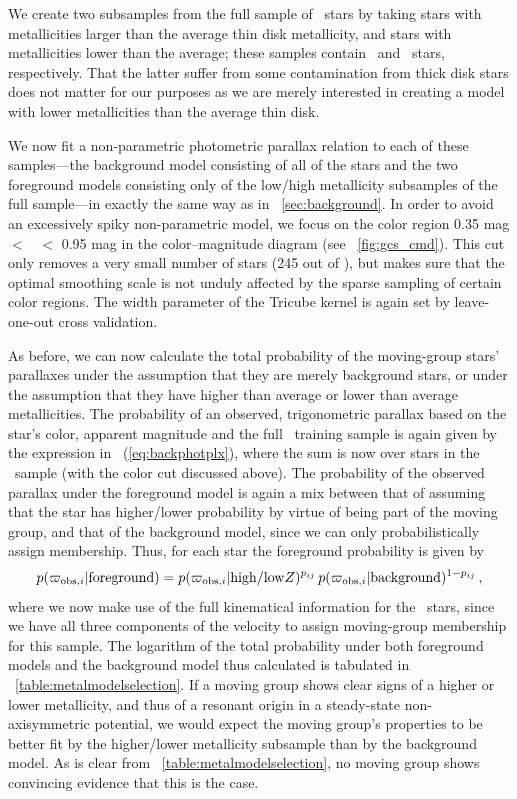 We create two subsamples from the full sample of \ngcsstars\ stars by
taking stars with metallicities larger than the average thin disk
metallicity, and stars with metallicities lower than the average;
these samples contain \nphotgcscolorcuthighz\ and
\nphotgcscolorcutlowz\ stars, respectively. That the latter suffer
from some contamination from thick disk stars does not matter for our
purposes as we are merely interested in creating a model with lower
metallicities than the average thin disk.

We now fit a non-parametric photometric parallax relation to each of
these samples---the background model consisting of all of the stars
and the two foreground models consisting only of the low/high
metallicity subsamples of the full sample---in exactly the same way as
in \sectionname~\ref{sec:background}. In order to avoid an excessively
spiky non-parametric model, we focus on the color region 0.35 mag $<$
\bminusv\ $<$ 0.95 mag in the color--magnitude diagram (see
\figurename~\ref{fig:gcs_cmd}). This cut only removes a very small
number of stars (245 out of \ngcsstars), but makes sure that the
optimal smoothing scale is not unduly affected by the sparse sampling
of certain color regions. The width parameter of the Tricube kernel is
again set by leave-one-out cross validation.

As before, we can now calculate the total probability of the
moving-group stars' parallaxes under the assumption that they are
merely background stars, or under the assumption that they have higher
than average or lower than average metallicities. The probability of
an observed, trigonometric parallax based on the star's color,
apparent magnitude and the full \gcsabb\ training sample is again
given by the expression in \eqnname~(\ref{eq:backphotplx}), where the
sum is now over stars in the \gcsabb\ sample (with the color cut
discussed above). The probability of the observed parallax under the
foreground model is again a mix between that of assuming that the star
has higher/lower probability by virtue of being part of the moving
group, and that of the background model, since we can only
probabilistically assign membership. Thus, for each star the
foreground probability is given by
\begin{equation}
p(\varpi_{\mathrm{obs},i} | \mathrm{foreground}) = p(\varpi_{\mathrm{obs},i} | \mathrm{high/low} Z)^{p_{ij}}\,p(\varpi_{\mathrm{obs},i} | \mathrm{background})^{1-p_{ij}}\,,
\end{equation}
where we now make use of the full kinematical information for the
\gcsabb\ stars, since we have all three components of the velocity to
assign moving-group membership for this sample. The logarithm of the
total probability under both foreground models and the background
model thus calculated is tabulated in
\tablename~\ref{table:metalmodelselection}. If a moving group shows
clear signs of a higher or lower metallicity, and thus of a resonant
origin in a steady-state non-axisymmetric potential, we would expect
the moving group's properties to be better fit by the higher/lower
metallicity subsample than by the background model. As is clear from
\tablename~\ref{table:metalmodelselection}, no moving group shows
convincing evidence that this is the case.


